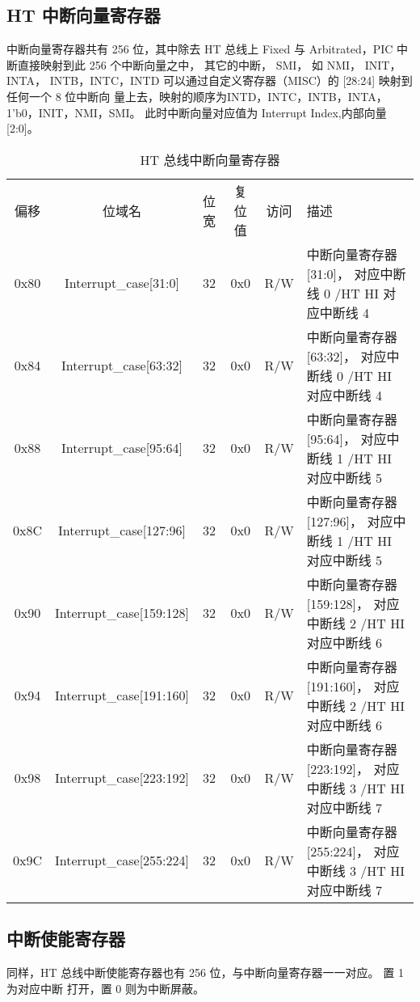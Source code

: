\subsection{HT 中断向量寄存器}

中断向量寄存器共有 256 位，其中除去 HT 总线上 Fixed 与 Arbitrated，PIC
中断直接映射到此 256 个中断向量之中， 其它的中断， SMI， 如 NMI， INIT， INTA，
INTB，INTC，INTD 可以通过自定义寄存器（MISC）的 [28:24] 映射到任何一个 8
位中断向 量上去，映射的顺序为{INTD，INTC，INTB，INTA，1’b0，INIT，NMI，SMI}。
此时中断向量对应值为 {Interrupt Index,内部向量[2:0]}。

\begin{table}
  \centering
  \begin{tabular}{|c|c|c|c|c|p{6cm}|} \hline
    偏移  & 位域名   & 位宽 & 复位值 & 访问 & 描述 \\ \hhline
    0x80 & Interrupt\_case[31:0]    & 32 & 0x0 & R/W & 中断向量寄存器[31:0]，   对应中断线 0 /HT HI 对应中断线 4 \\
    0x84 & Interrupt\_case[63:32]   & 32 & 0x0 & R/W & 中断向量寄存器[63:32]，  对应中断线 0 /HT HI 对应中断线 4 \\
    0x88 & Interrupt\_case[95:64]   & 32 & 0x0 & R/W & 中断向量寄存器[95:64]，  对应中断线 1 /HT HI 对应中断线 5 \\
    0x8C & Interrupt\_case[127:96]  & 32 & 0x0 & R/W & 中断向量寄存器[127:96]， 对应中断线 1 /HT HI 对应中断线 5 \\
    0x90 & Interrupt\_case[159:128] & 32 & 0x0 & R/W & 中断向量寄存器[159:128]， 对应中断线 2 /HT HI 对应中断线 6 \\
    0x94 & Interrupt\_case[191:160] & 32 & 0x0 & R/W & 中断向量寄存器[191:160]， 对应中断线 2 /HT HI 对应中断线 6 \\
    0x98 & Interrupt\_case[223:192] & 32 & 0x0 & R/W & 中断向量寄存器[223:192]， 对应中断线 3 /HT HI 对应中断线 7 \\
    0x9C & Interrupt\_case[255:224] & 32 & 0x0 & R/W & 中断向量寄存器[255:224]， 对应中断线 3 /HT HI 对应中断线 7 \\
    \hline
  \end{tabular}
  \caption{HT 总线中断向量寄存器}
  \label{tab:htintvec}
\end{table}

\subsection{中断使能寄存器}

同样，HT 总线中断使能寄存器也有 256 位，与中断向量寄存器一一对应。 置 1 为对应中断 打开，置 0 则为中断屏蔽。

